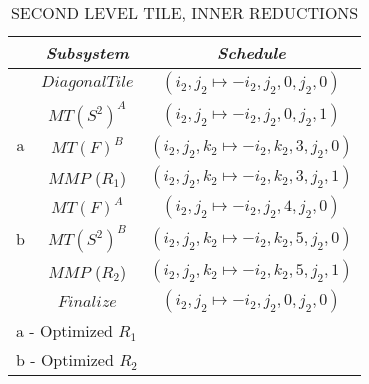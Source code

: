 \begin{table}[htbp]
\caption{\uppercase{Second Level Tile, Inner Reductions}}
\begin{center}
\begin{tabular}{|c|c|c|}
\hline
\textbf{} & \textbf{\textit{Subsystem}}& \textbf{\textit{Schedule}} \\
\hline
 & $Diagonal Tile$ & $(i_{2},j_{2} \mapsto -i_{2}, j_{2}, 0, j_{2}, 0)$   \\
\cline{2-3} 
\hline
 & $MT(S^{2})^{A}$ & $(i_{2},j_{2} \mapsto -i_{2}, j_{2}, 0, j_{2}, 1)$   \\
\cline{2-3} 
${\mathrm{a}}$ & $MT(F)^{B}$ & $(i_{2},j_{2},k_{2} \mapsto -i_{2}, k_{2}, 3, j_{2}, 0)$    \\
 \cline{2-3} 
 &  $MMP$ ($R_{1}$) & $(i_{2},j_{2},k_{2} \mapsto -i_{2}, k_{2}, 3, j_{2}, 1)$ \\
\hline
 & $MT(F)^{A}$ & $(i_{2},j_{2} \mapsto -i_{2}, j_{2}, 4, j_{2}, 0)$    \\
\cline{2-3} 
${\mathrm{b}}$ & $MT(S^{2})^{B}$ & $(i_{2},j_{2},k_{2} \mapsto -i_{2}, k_{2}, 5, j_{2}, 0)$    \\
 \cline{2-3} 
 & $MMP$ ($R_{2}$) & $(i_{2},j_{2},k_{2} \mapsto -i_{2}, k_{2}, 5, j_{2}, 1)$ \\
\hline
& $Finalize$ & $(i_{2},j_{2} \mapsto -i_{2}, j_{2}, 0, j_{2}, 0)$ \\
\hline
\multicolumn{3}{l}{${\mathrm{a}}$ - Optimized $R_{1}$}\\
\multicolumn{3}{l}{${\mathrm{b}}$ - Optimized $R_{2}$}\\
\end{tabular}
\label{tab:bpm_l2_inner_reduction_schedule}
\end{center}
\end{table}

